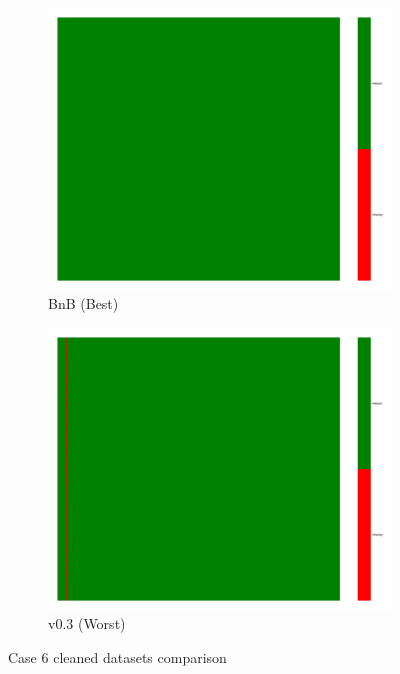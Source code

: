 \documentclass[a4paper,12pt]{article}
\begin{document}
\begin{figure}[H]
    \centering
    \begin{subfigure}{0.45\textwidth}
        \includegraphics[width=\linewidth]{case6_bnb_heatmap_cleaned.png}
        \caption{BnB (Best)}
    \end{subfigure}
    \hfill
    \begin{subfigure}{0.45\textwidth}
        \includegraphics[width=\linewidth]{case6_v0.3_heatmap_cleaned.png}
        \caption{v0.3 (Worst)}
    \end{subfigure}
    \caption{Case 6 cleaned datasets comparison}
\end{figure}
\end{document}
